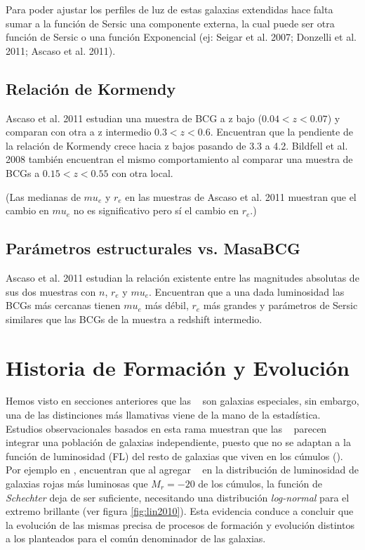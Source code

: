 Para poder ajustar los perfiles de luz de estas galaxias extendidas hace falta sumar a la funci\'on de Sersic una componente externa, la cual puede ser otra funci\'on de Sersic o una funci\'on Exponencial (ej: Seigar et al. 2007; Donzelli et al. 2011; Ascaso et al. 2011). 

\subsection{Relaci\'on de Kormendy}
Ascaso et al. 2011 estudian una muestra de BCG a z bajo ($0.04<z<0.07$) y comparan con otra a z intermedio $0.3<z<0.6$. Encuentran que la pendiente de la relaci\'on de Kormendy crece hacia z bajos pasando de 3.3 a 4.2. Bildfell et al. 2008 tambi\'en encuentran el mismo comportamiento al comparar una muestra de BCGs a $0.15<z<0.55$  con otra local.

(Las medianas de $mu_e$ y $r_e$ en las muestras de Ascaso et al. 2011 muestran que el cambio en $mu_e$ no es significativo pero s\'i el cambio en $r_e$.)

\subsection{Par\'ametros estructurales vs. MasaBCG}
Ascaso et al. 2011 estudian  la relaci\'on existente entre las magnitudes absolutas de sus dos muestras con $n$, $r_e$ y $mu_e$. Encuentran que a una dada luminosidad las BCGs m\'as cercanas tienen $mu_e$ m\'as d\'ebil, $r_e$ m\'as grandes y par\'ametros de Sersic similares que las BCGs de la muestra a redshift intermedio.






\section{Historia de Formaci\'on y Evoluci\'on}\label{sec:tformyevol}

Hemos visto en secciones anteriores que las \bcgs~ son galaxias especiales, sin embargo, una de las
distinciones m\'as llamativas viene de la mano de la estad\'istica.
Estudios observacionales basados en esta rama muestran que las \bcgs~ parecen integrar una poblaci\'on de galaxias independiente,
puesto que no se adaptan a la funci\'on de luminosidad (FL)
del resto de galaxias que viven en los c\'umulos (\cite{tre77}). Por ejemplo en \cite{lin10},
encuentran que al agregar \bcgs~ en la distribuci\'on de luminosidad de galaxias rojas m\'as luminosas que $M_{r}=-20$
de los c\'umulos, la funci\'on de \textit{Schechter} deja de ser suficiente, necesitando una distribuci\'on 
\textit{log-normal} para el extremo brillante (ver figura \ref{fig:lin2010}). Esta evidencia
conduce a concluir que la evoluci\'on de las mismas precisa de procesos de formaci\'on
y evoluci\'on distintos a los planteados para el com\'un denominador de las galaxias.

